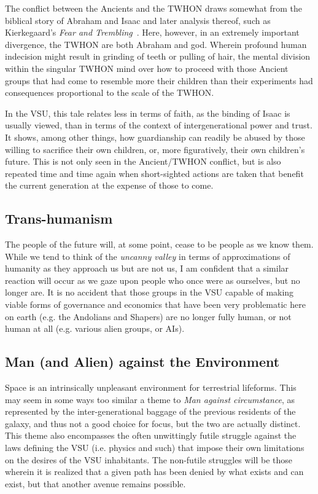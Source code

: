 The conflict between the Ancients and the TWHON draws somewhat from
the biblical story of Abraham and Isaac and later analysis thereof,
such as Kierkegaard's \emph{Fear and
Trembling}~\cite{KierkegaardFearandTrembling}. Here, however, in an
extremely important divergence, the TWHON are both Abraham and
god. Wherein profound human indecision might result in grinding of
teeth or pulling of hair, the mental division within the singular
TWHON mind over how to proceed with those Ancient groups that had
come to resemble more their children than their experiments had
consequences proportional to the scale of the TWHON.

In the VSU, this tale relates less in terms of faith, as the binding
of Isaac is usually viewed, than in terms of the context of
intergenerational power and trust. It shows, among other things, how
guardianship can readily be abused by those willing to sacrifice their
own children, or, more figuratively, their own children's future. This
is not only seen in the Ancient/TWHON conflict, but is also repeated
time and time again when short-sighted actions are taken that benefit
the current generation at the expense of those to come.

\subsection{Trans-humanism}

The people of the future will, at some point, cease to be people as we
know them. While we tend to think of the {\em uncanny valley} in terms
of approximations of humanity as they approach us but are not us, I am
confident that a similar reaction will occur as we gaze upon people
who once were as ourselves, but no longer are. It is no accident that
those groups in the VSU capable of making viable forms of governance and economics that have been very problematic here on earth (e.g. the
Andolians and Shapers) are no longer fully human, or not human at all
(e.g. various alien groups, or AIs).

\subsection{Man (and Alien) against the Environment}

Space is an intrinsically unpleasant environment for terrestrial
lifeforms. This may seem in some ways too similar a theme to {\em Man
against circumstance}, as represented by the inter-generational
baggage of the previous residents of the galaxy, and thus not a good
choice for focus, but the two are actually distinct. This theme also
encompasses the often unwittingly futile struggle against the laws
defining the VSU (i.e. physics and such) that impose their own
limitations on the desires of the VSU inhabitants. The non-futile
struggles will be those wherein it is realized that a given path has
been denied by what exists and can exist, but that another avenue
remains possible.

